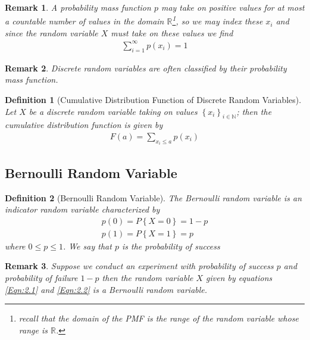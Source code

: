 \documentclass[11pt, oneside]{book}   	%
\newtheorem{definition}{Definition}[chapter]
\newtheorem{remark}{Remark}[chapter]
\begin{document}
\begin{spacing}{1.618}
\begin{remark}
	A probability mass function $p$ may take on positive values for at most a countable number of values in the domain $\mathbb{R}$\footnote{recall that the domain of the PMF is the range of the random variable whose range is $\mathbb{R}$.}, so we may index these $x_i$ and since the random variable $X$ must take on these values we find
	\begin{alignat}{4}
		\sum_{i=1}^\infty p(x_i)=1
	\end{alignat}
\end{remark}

\begin{remark}
	Discrete random variables are often classified by their probability mass function. 
\end{remark}

\begin{definition}[Cumulative Distribution Function of Discrete Random Variables]
	Let $X$ be a discrete random variable taking on values $\left\{x_i\right\}_{i\in\mathbb{N}}$; then the cumulative distribution function is given by 
	\begin{alignat}{4}
		F(a)=\sum_{x_i\leq a}p(x_i)
	\end{alignat} 
\end{definition}



\subsection{Bernoulli Random Variable}

\begin{definition}[Bernoulli Random Variable]
	The Bernoulli random variable is an indicator random variable characterized by 
	\begin{alignat}{4}
		p(0) = P\left\{X=0\right\} = 1-p \label{Eqn:2.1} \\
		p(1) = P\left\{X=1\right\} = p \label{Eqn:2.2}
	\end{alignat}
	where $0\leq p\leq 1$. We say that $p$ is the probability of success 
\end{definition}

\begin{remark}
	Suppose we conduct an experiment with probability of success $p$ and probability of failure $1-p$ then the random variable $X$ given by equations \ref{Eqn:2.1} and \ref{Eqn:2.2} is a Bernoulli random variable. 
\end{remark}


\end{spacing}
\end{document}
